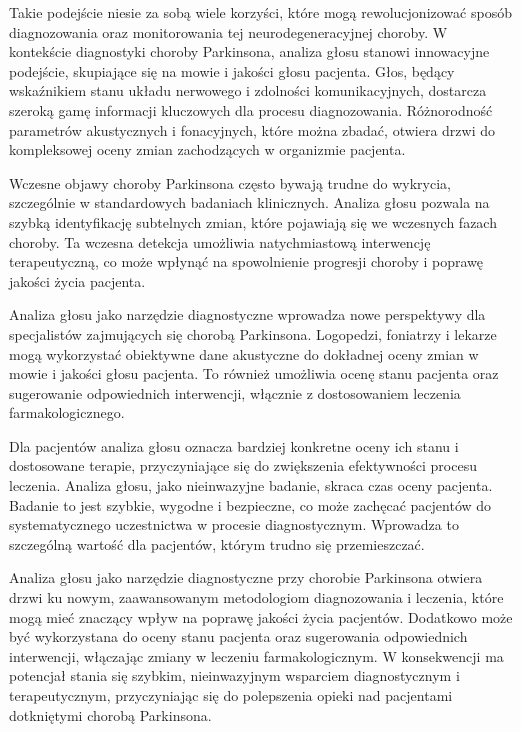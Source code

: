 Takie podejście niesie za sobą wiele korzyści, które mogą rewolucjonizować sposób diagnozowania oraz monitorowania tej neurodegeneracyjnej choroby.
W kontekście diagnostyki choroby Parkinsona, analiza głosu stanowi innowacyjne podejście, skupiające się na mowie i jakości głosu pacjenta.
Głos, będący wskaźnikiem stanu układu nerwowego i zdolności komunikacyjnych, dostarcza szeroką gamę informacji kluczowych dla procesu diagnozowania.
Różnorodność parametrów akustycznych i fonacyjnych, które można zbadać, otwiera drzwi do kompleksowej oceny zmian zachodzących w organizmie pacjenta.

Wczesne objawy choroby Parkinsona często bywają trudne do wykrycia, szczególnie w standardowych badaniach klinicznych.
Analiza głosu pozwala na szybką identyfikację subtelnych zmian, które pojawiają się we wczesnych fazach choroby.
Ta wczesna detekcja umożliwia natychmiastową interwencję terapeutyczną, co może wpłynąć na spowolnienie progresji choroby i poprawę jakości życia pacjenta.

Analiza głosu jako narzędzie diagnostyczne wprowadza nowe perspektywy dla specjalistów zajmujących się chorobą Parkinsona.
Logopedzi, foniatrzy i lekarze mogą wykorzystać obiektywne dane akustyczne do dokładnej oceny zmian w mowie i jakości głosu pacjenta.
To również umożliwia ocenę stanu pacjenta oraz sugerowanie odpowiednich interwencji, włącznie z dostosowaniem leczenia farmakologicznego.

Dla pacjentów analiza głosu oznacza bardziej konkretne oceny ich stanu i dostosowane terapie, przyczyniające się do zwiększenia efektywności procesu leczenia.
Analiza głosu, jako nieinwazyjne badanie, skraca czas oceny pacjenta.
Badanie to jest szybkie, wygodne i bezpieczne, co może zachęcać pacjentów do systematycznego uczestnictwa w procesie diagnostycznym.
Wprowadza to szczególną wartość dla pacjentów, którym trudno się przemieszczać.

Analiza głosu jako narzędzie diagnostyczne przy chorobie Parkinsona otwiera drzwi ku nowym, zaawansowanym metodologiom diagnozowania i leczenia,
które mogą mieć znaczący wpływ na poprawę jakości życia pacjentów.
Dodatkowo może być wykorzystana do oceny stanu pacjenta oraz sugerowania odpowiednich interwencji, włączając zmiany w leczeniu farmakologicznym.
W konsekwencji ma potencjał stania się szybkim, nieinwazyjnym wsparciem diagnostycznym i terapeutycznym, przyczyniając się do polepszenia
opieki nad pacjentami dotkniętymi chorobą Parkinsona.

